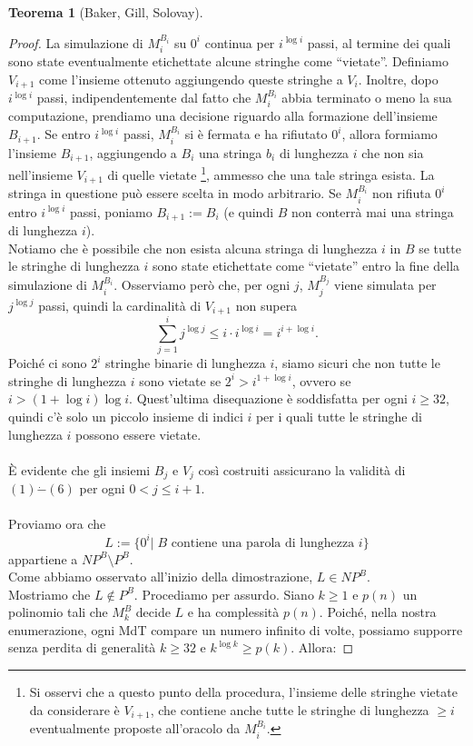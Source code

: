 \documentclass[12pt,a4paper]{report}
\theoremstyle{definition}
\newtheorem{teo}{Teorema}[section]  %
\begin{document}
\begin{teo}[Baker, Gill, Solovay]
\begin{proof}
La simulazione di $M_i^{B_i}$ su $0^i$ continua per $i^{\log i}$ passi, al termine dei quali sono state eventualmente etichettate alcune stringhe come ``vietate''. Definiamo $V_{i+1}$ come l'insieme ottenuto aggiungendo queste stringhe a $V_i$. Inoltre, dopo $i^{\log i}$ passi, indipendentemente dal fatto che $M_i^{B_i}$ abbia terminato o meno la sua computazione, prendiamo una decisione riguardo alla formazione dell'insieme $B_{i+1}$. Se entro $i^{\log i}$ passi, $M_i^{B_i}$ si è fermata e ha rifiutato $0^i$, allora formiamo l'insieme $B_{i+1}$, aggiungendo a $B_i$ una stringa $b_i$ di lunghezza $i$ che non sia nell'insieme $V_{i+1}$ di quelle vietate \footnote{Si osservi che a questo punto della procedura, l'insieme delle stringhe vietate da considerare è $V_{i+1}$, che contiene anche tutte le stringhe di lunghezza $\geq i$ eventualmente proposte all'oracolo da $M_i^{B_i}$.}, ammesso che una tale stringa esista. La stringa in questione può essere scelta in modo arbitrario. Se $M_i^{B_i}$ non rifiuta $0^i$ entro $i^{\log i}$ passi, poniamo $B_{i+1}:=B_i$ (e quindi $B$ non conterrà mai una stringa di lunghezza $i$).\\
Notiamo che è possibile che non esista alcuna stringa di lunghezza $i$ in $B$ se tutte le stringhe di lunghezza $i$ sono state etichettate come ``vietate'' entro la fine della simulazione di $M_i^{B_i}$. Osserviamo però che, per ogni $j$, $M_j^{B_j}$ viene simulata per $j^{\log j}$ passi, quindi la cardinalità di $V_{i+1}$ non supera
$$\sum_{j=1}^i j^{\log j} \leq i \cdot i^{\log i} = i^{i+\log i}.$$
Poiché ci sono $2^i$ stringhe binarie di lunghezza $i$, siamo sicuri che non tutte le stringhe di lunghezza $i$ sono vietate se $2^i > i^{1+\log i}$, ovvero se $i > (1+\log i) \log i$. Quest'ultima disequazione è soddisfatta per ogni $i \geq 32$, quindi c'è solo un piccolo insieme di indici $i$ per i quali tutte le stringhe di lunghezza $i$ possono essere vietate.\\
\\
È evidente che gli insiemi $B_{j}$ e $V_{j}$ così costruiti assicurano la validità di $(1)\dot{-}(6)$ per ogni $0 < j \leq i+1$.\\
\\
Proviamo ora che
$$L:=\{0^i | \; B \text{ contiene una parola di lunghezza } i\}$$
appartiene a $NP^B \setminus P^B$.\\
Come abbiamo osservato all'inizio della dimostrazione, $L \in NP^B$.\\
Mostriamo che $L \not\in P^B$. Procediamo per assurdo. Siano $k \geq 1$ e $p(n)$ un polinomio tali che $M_k^B$ decide $L$ e ha complessità $p(n)$. Poiché, nella nostra enumerazione, ogni MdT compare un numero infinito di volte, possiamo supporre senza perdita di generalità $k \geq 32$ e $k^{\log k} \geq p(k)$. Allora:

\end{proof}
\end{teo}
\end{document}
